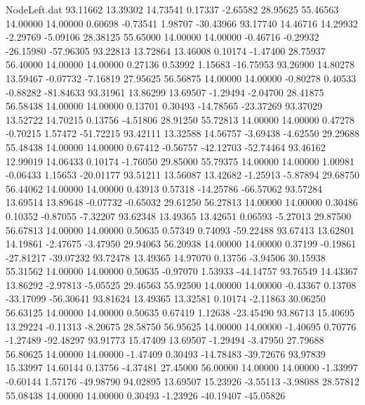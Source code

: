 \begin{filecontents}{NodeLeft.dat}
  93.11662   13.39302   14.73541     0.17337   -2.65582   28.95625   55.46563   14.00000   14.00000    0.60698   -0.73541    1.98707  -30.43966
  93.17740   14.46716   14.29932    -2.29769   -5.09106   28.38125   55.65000   14.00000   14.00000   -0.46716   -0.29932  -26.15980  -57.96305
  93.22813   13.72864   13.46008     0.10174   -1.47400   28.75937   56.40000   14.00000   14.00000    0.27136    0.53992    1.15683  -16.75953
  93.26900   14.80278   13.59467    -0.07732   -7.16819   27.95625   56.56875   14.00000   14.00000   -0.80278    0.40533   -0.88282  -81.84633
  93.31961   13.86299   13.69507    -1.29494   -2.04700   28.41875   56.58438   14.00000   14.00000    0.13701    0.30493  -14.78565  -23.37269
  93.37029   13.52722   14.70215     0.13756   -4.51806   28.91250   55.72813   14.00000   14.00000    0.47278   -0.70215    1.57472  -51.72215
  93.42111   13.32588   14.56757    -3.69438   -4.62550   29.29688   55.48438   14.00000   14.00000    0.67412   -0.56757  -42.12703  -52.74464
  93.46162   12.99019   14.06433     0.10174   -1.76050   29.85000   55.79375   14.00000   14.00000    1.00981   -0.06433    1.15653  -20.01177
  93.51211   13.56087   13.42682    -1.25913   -5.87894   29.68750   56.44062   14.00000   14.00000    0.43913    0.57318  -14.25786  -66.57062
  93.57284   13.69514   13.89648    -0.07732   -0.65032   29.61250   56.27813   14.00000   14.00000    0.30486    0.10352   -0.87055   -7.32207
  93.62348   13.49365   13.42651     0.06593   -5.27013   29.87500   56.67813   14.00000   14.00000    0.50635    0.57349    0.74093  -59.22488
  93.67413   13.62801   14.19861    -2.47675   -3.47950   29.94063   56.20938   14.00000   14.00000    0.37199   -0.19861  -27.81217  -39.07232
  93.72478   13.49365   14.97070     0.13756   -3.94506   30.15938   55.31562   14.00000   14.00000    0.50635   -0.97070    1.53933  -44.14757
  93.76549   14.43367   13.86292    -2.97813   -5.05525   29.46563   55.92500   14.00000   14.00000   -0.43367    0.13708  -33.17099  -56.30641
  93.81624   13.49365   13.32581     0.10174   -2.11863   30.06250   56.63125   14.00000   14.00000    0.50635    0.67419    1.12638  -23.45490
  93.86713   15.40695   13.29224    -0.11313   -8.20675   28.58750   56.95625   14.00000   14.00000   -1.40695    0.70776   -1.27489  -92.48297
  93.91773   15.47409   13.69507    -1.29494   -3.47950   27.79688   56.80625   14.00000   14.00000   -1.47409    0.30493  -14.78483  -39.72676
  93.97839   15.33997   14.60144     0.13756   -4.37481   27.45000   56.00000   14.00000   14.00000   -1.33997   -0.60144    1.57176  -49.98790
  94.02895   13.69507   15.23926    -3.55113   -3.98088   28.57812   55.08438   14.00000   14.00000    0.30493   -1.23926  -40.19407  -45.05826

\end{filecontents}
